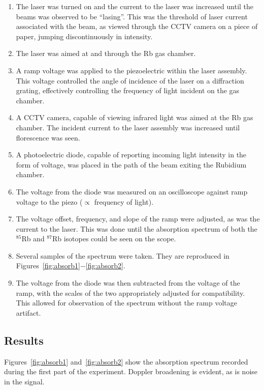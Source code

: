 \documentclass[paper=a4, fontsize=11pt]{scrartcl} %
\numberwithin{equation}{section}
\numberwithin{figure}{section}
\numberwithin{table}{section}
\begin{document}
\begin{enumerate}
\item The laser was turned on and the current to the laser
  was increased until the beams was observed to be ``lasing''. This
  was the threshold of laser current associated with the beam, as viewed through
  the CCTV camera on a piece of paper, jumping discontinuously in intensity. 
\item The laser was aimed at and through the Rb gas chamber.
\item A ramp voltage was applied to the piezoelectric within the laser
  assembly. This voltage controlled the angle of incidence of the
  laser on a diffraction grating, effectively controlling the
  frequency of light incident on the gas chamber. 
\item A CCTV camera, capable of viewing infrared light was aimed at the Rb gas chamber. The incident current to the laser assembly was increased until florescence was seen.
\item A photoelectric diode, capable of reporting incoming light
  intensity in the form of voltage, was placed in the path of the beam
  exiting the Rubidium chamber.
\item The voltage from the diode was measured on an oscilloscope
  against ramp voltage to the piezo ($\propto$ frequency of light).
\item The voltage offset, frequency, and slope of the ramp were adjusted, as was the current to the laser. This was done until the absorption spectrum of both the $^{85}$Rb and $^{87}$Rb isotopes could be seen on the scope.
\item Several samples of the spectrum were taken. They are reproduced in Figures~\ref{fig:absorb1}$-$\ref{fig:absorb2}.
\item The voltage from the diode was then subtracted from the voltage of the ramp, with the scales of the two appropriately adjusted for compatibility. This allowed for observation of the spectrum without the ramp voltage artifact.
\end{enumerate}

\subsection{Results}

Figures~\ref{fig:absorb1} and~\ref{fig:absorb2} show the absorption spectrum recorded during the first part of the experiment. Doppler broadening is evident, as is noise in the signal.
\end{document}
